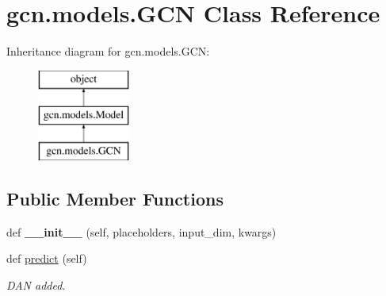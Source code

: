 \hypertarget{classgcn_1_1models_1_1GCN}{}\section{gcn.\+models.\+G\+CN Class Reference}
\label{classgcn_1_1models_1_1GCN}
Inheritance diagram for gcn.\+models.\+G\+CN\+:\begin{figure}[H]
\begin{center}
\leavevmode
\includegraphics[height=3.000000cm]{classgcn_1_1models_1_1GCN}
\end{center}
\end{figure}
\subsection*{Public Member Functions}
\begin{DoxyCompactItemize}
\item 
\mbox{\label{classgcn_1_1models_1_1GCN_abfcd5f331fe55d81eeba76b836d5757f}} 
def {\bfseries \+\_\+\+\_\+init\+\_\+\+\_\+} (self, placeholders, input\+\_\+dim, kwargs)
\item 
\mbox{\label{classgcn_1_1models_1_1GCN_a17887b9224a0b530c65b0b45385d5799}} 
def \mbox{\hyperlink{classgcn_1_1models_1_1GCN_a17887b9224a0b530c65b0b45385d5799}{predict}} (self)
\begin{DoxyCompactList}\small\item\em D\+AN added. \end{DoxyCompactList}\end{DoxyCompactItemize}

